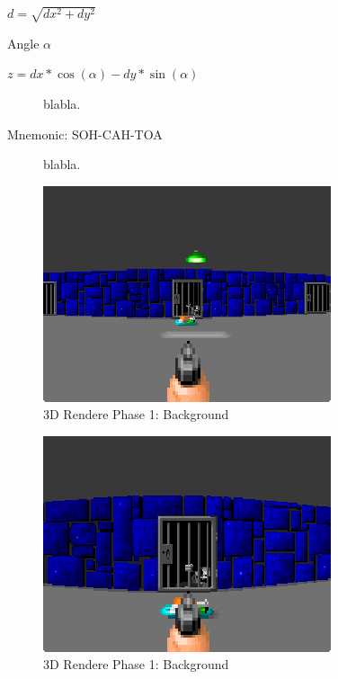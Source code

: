 \documentclass[book.tex]{subfiles}
\begin{document}
\begin{math}
	d = \sqrt{dx^2 + dy^2}
\end{math}

Angle 
\begin{math}\alpha\end{math}

\begin{math}
	z = dx * \cos(\alpha) - dy * \sin(\alpha)
\end{math}

\begin{figure}[H]
\centering
 
 \caption{blabla.} \label{fig:Raycasting2}
\end{figure}

Mnemonic: SOH-CAH-TOA\\


\begin{figure}[H]
\centering
 
 \caption{blabla.} \label{fig:Raycasting2}
\end{figure}

\begin{figure}[H]
\centering
 \includegraphics[scale=1.3]{imgs/fish_eye/bad_mild.png}
 \caption{3D Rendere Phase 1: Background} \label{fig:mips}
 \end{figure}
 
\begin{figure}[H]
\centering
 \includegraphics[scale=1.3]{imgs/fish_eye/bad_ok.png}
 \caption{3D Rendere Phase 1: Background} \label{fig:mips}
 \end{figure}
 
\end{document}
